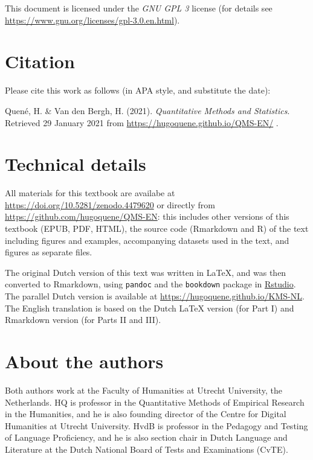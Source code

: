 \documentclass[
]{book}
\begin{document}
This document is licensed under the \emph{GNU GPL 3} license (for details see
\url{https://www.gnu.org/licenses/gpl-3.0.en.html}).

\hypertarget{citation}{%
\section*{Citation}\label{citation}}

Please cite this work as follows (in APA style, and substitute the date):

Quené, H. \& Van den Bergh, H. (2021). \emph{Quantitative Methods and Statistics}.
Retrieved 29 January 2021 from \url{https://hugoquene.github.io/QMS-EN/} .

\hypertarget{technical-details}{%
\section*{Technical details}\label{technical-details}}

All materials for this textbook are availabe at
\url{https://doi.org/10.5281/zenodo.4479620} or directly from
\url{https://github.com/hugoquene/QMS-EN}:
this includes other versions of this textbook (EPUB, PDF, HTML), the source code (Rmarkdown and R) of the text including figures and examples, accompanying datasets used in the text, and figures as separate files.

The original Dutch version of this text was written in LaTeX, and was then converted to Rmarkdown, using \texttt{pandoc} \citep{pandoc} and the \texttt{bookdown} package \citep{R-bookdown} in \href{https://www.rstudio.com}{Rstudio}. The parallel Dutch version is available at \url{https://hugoquene.github.io/KMS-NL}.
The English translation is based on the Dutch LaTeX version (for Part I) and Rmarkdown version (for Parts II and III).

\hypertarget{about-the-authors}{%
\section*{About the authors}\label{about-the-authors}}

Both authors work at the Faculty of Humanities at Utrecht University, the Netherlands.
HQ is professor in the Quantitative Methods of Empirical Research in the Humanities, and he is also founding director of the Centre for Digital Humanities at Utrecht University. HvdB is professor in the Pedagogy and Testing of Language Proficiency, and he is also section chair in Dutch Language and Literature at the Dutch National Board of Tests and Examinations (CvTE).
\end{document}
